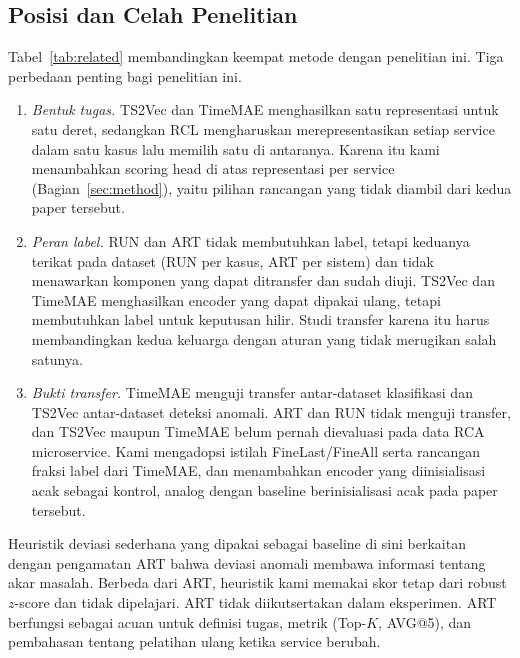 \subsection{Posisi dan Celah Penelitian}
Tabel~\ref{tab:related} membandingkan keempat metode dengan penelitian ini. Tiga perbedaan penting bagi penelitian ini.
\begin{enumerate}
\item \emph{Bentuk tugas.} TS2Vec dan TimeMAE menghasilkan satu representasi untuk satu deret, sedangkan RCL mengharuskan merepresentasikan setiap service dalam satu kasus lalu memilih satu di antaranya. Karena itu kami menambahkan scoring head di atas representasi per service (Bagian~\ref{sec:method}), yaitu pilihan rancangan yang tidak diambil dari kedua paper tersebut.
\item \emph{Peran label.} RUN dan ART tidak membutuhkan label, tetapi keduanya terikat pada dataset (RUN per kasus, ART per sistem) dan tidak menawarkan komponen yang dapat ditransfer dan sudah diuji. TS2Vec dan TimeMAE menghasilkan encoder yang dapat dipakai ulang, tetapi membutuhkan label untuk keputusan hilir. Studi transfer karena itu harus membandingkan kedua keluarga dengan aturan yang tidak merugikan salah satunya.
\item \emph{Bukti transfer.} TimeMAE menguji transfer antar-dataset klasifikasi dan TS2Vec antar-dataset deteksi anomali. ART dan RUN tidak menguji transfer, dan TS2Vec maupun TimeMAE belum pernah dievaluasi pada data RCA microservice. Kami mengadopsi istilah FineLast/FineAll serta rancangan fraksi label dari TimeMAE, dan menambahkan encoder yang diinisialisasi acak sebagai kontrol, analog dengan baseline berinisialisasi acak pada paper tersebut.
\end{enumerate}
Heuristik deviasi sederhana yang dipakai sebagai baseline di sini berkaitan dengan pengamatan ART bahwa deviasi anomali membawa informasi tentang akar masalah. Berbeda dari ART, heuristik kami memakai skor tetap dari robust $z$-score dan tidak dipelajari. ART tidak diikutsertakan dalam eksperimen. ART berfungsi sebagai acuan untuk definisi tugas, metrik (Top-$K$, AVG@5), dan pembahasan tentang pelatihan ulang ketika service berubah.

